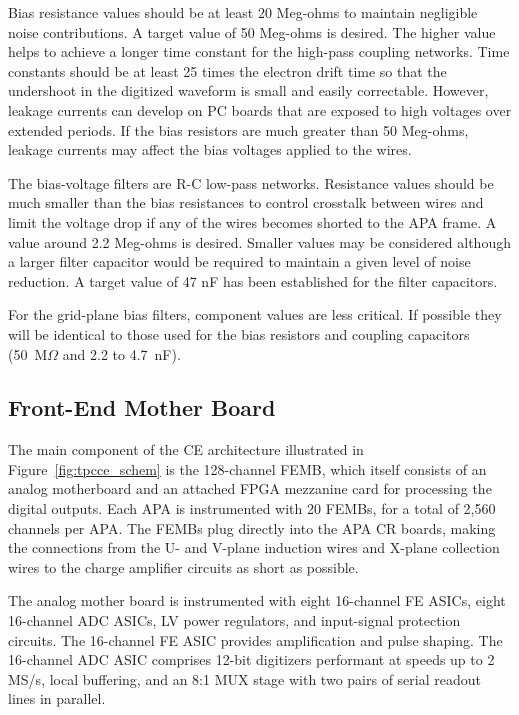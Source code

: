 Bias resistance values should be at least 20 Meg-ohms to maintain negligible noise contributions.
A target value of 50 Meg-ohms is desired.
The higher value helps to achieve a longer time constant for the high-pass coupling networks.
Time constants should be at least 25 times the electron drift time so that the undershoot in the digitized waveform
is small and easily correctable.
However, leakage currents can develop on PC boards that are exposed to high voltages over extended periods.
If the bias resistors are much greater than 50 Meg-ohms, leakage currents may affect the bias voltages applied to the wires.

The bias-voltage filters are R-C low-pass networks.
Resistance values should be much smaller than the bias resistances to control crosstalk between wires
and limit the voltage drop if any of the wires becomes shorted to the APA frame.
A value around 2.2 Meg-ohms is desired.
Smaller values may be considered although a larger filter capacitor would be required to maintain a given level of noise reduction.
A target value of 47 nF has been established for the filter capacitors.

For the grid-plane bias filters, component values are less critical.
If possible they will be identical to those used for the bias resistors and coupling capacitors
(50~M$\Omega$ and 2.2 to 4.7~nF).


\subsection{Front-End Mother Board}
\label{subsec:fe_arch}

The main component of the CE architecture illustrated in Figure~\ref{fig:tpcce_schem} is the 
128-channel FEMB, which itself consists of an analog motherboard and an attached FPGA 
mezzanine card for processing the digital outputs.
Each APA is instrumented with 20 FEMBs, for a total of 2,560 channels per APA.
The FEMBs plug directly into the APA CR boards, making the connections from the U- and V-plane induction wires and 
X-plane collection wires to the charge amplifier circuits as short as possible.

The analog mother board is instrumented with eight 16-channel FE ASICs,
eight 16-channel ADC ASICs, LV power regulators, and input-signal protection circuits.
The 16-channel FE ASIC provides amplification and pulse shaping.
The 16-channel ADC ASIC comprises  12-bit digitizers performant at speeds up to 2 MS/s, local buffering,
and an 8:1 MUX stage with two pairs of serial readout lines in parallel.

